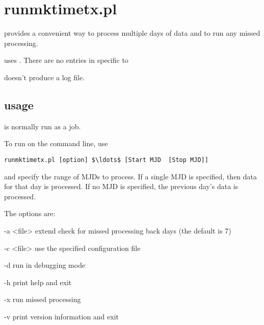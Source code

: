 
\section{runmktimetx.pl \label{runmktimetx}}

\hypertarget{h:runmktimetx}{}

 provides a convenient way to process multiple days of data and to run any missed processing.

 uses . There are no entries in  specific to 

 doesn't produce a log file.
	
\subsection{usage}
 is normally run as a  job.

To run  on the command line, use
\begin{lstlisting}[mathescape=true]
runmktimetx.pl [option] $\ldots$ [Start MJD  [Stop MJD]]
\end{lstlisting}

 and  specify the range of MJDs to process.
If a single MJD is specified, then data for that day is processed. If no
MJD is specified, the previous day's data is processed.

The options are:
\begin{description*}
	\item[-a \textless{file}\textgreater]  extend check for missed processing back  days 
		(the default is 7)
	\item[-c \textless{file}\textgreater] use the specified configuration file
	\item[-d]	run in debugging mode
	\item[-h]	print help and exit
	\item[-x] run missed processing
	\item[-v]	print version information and exit
\end{description*}
